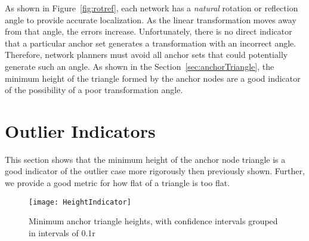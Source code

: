 As shown in Figure~\ref{fig:rotref}, each network has a \emph{natural} rotation or reflection angle to provide accurate localization.  As the linear transformation moves away from that angle, the errors increase.  Unfortunately, there is no direct indicator that a particular anchor set generates a transformation with an incorrect angle.  Therefore, network planners must avoid all anchor sets that could potentially generate such an angle.  As shown in the Section~\ref{sec:anchorTriangle}, the minimum height of the triangle formed by the anchor nodes are a good indicator of the possibility of a poor transformation angle.  

\section{Outlier Indicators} 

This section shows that the minimum height of the anchor node triangle is a good indicator of the outlier case more rigorously then previously shown.  Further, we provide a good metric for how flat of a triangle is too flat.

\begin{figure}
  \centering
	\texttt{[image: HeightIndicator]}
	\caption[Minimum anchor triangle heights]{Minimum anchor triangle heights, with confidence intervals grouped in intervals of 0.1r}	
	\label{fig:heightIndicator}
\end{figure}

